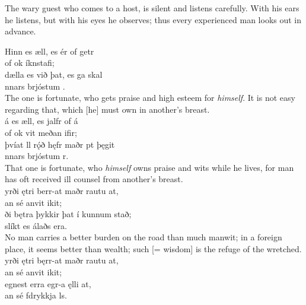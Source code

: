 \bvb The wary guest who comes to a host, is silent and listens carefully\footnotemark[13]. With his ears he listens, but with his eyes he observes; thus every experienced man looks out in advance. \\

\bva Hinn es æll, \hld es ér of getr \\%
\ind {}of ok íknstafi; \\%
dælla es við þat, \hld es ga skal \\%
\ind {}nnars brjóstum .\\%

\bvb The one is fortunate, who gets praise and high esteem for \emph{himself}. It is not easy regarding that, which [he] must own in another's breast. \\

\bva {}á es æll, \hld es jalfr of á \\%
\ind {}of ok vit meðan ifir; \\%
þvíat ll rǫ́ð \hld hęfr maðr pt þęgit \\%
\ind {}nnars brjóstum r.\\%

\bvb That one is fortunate, who \emph{himself} owns praise and wits while he lives, for man has oft received ill counsel from another's breast. \\

\bva {}yrði ętri \hld berr-at maðr rautu at, \\%
\ind an sé anvit ikit; \\%
ði bętra \hld þykkir þat í kunnum stað; \\%
\ind slíkt es álaðs era.\\%

\bvb No man carries a better burden on the road than much manwit; in a foreign place, it seems better than wealth; such [= wisdom] is the refuge of the wretched. \\

\bva {}yrði ętri \hld bęrr-at maðr rautu at, \\%
\ind an sé anvit ikit; \\%
egnest erra \hld {}egr-a ęlli at, \\%
\ind an sé fdrykkja ls.\\%

